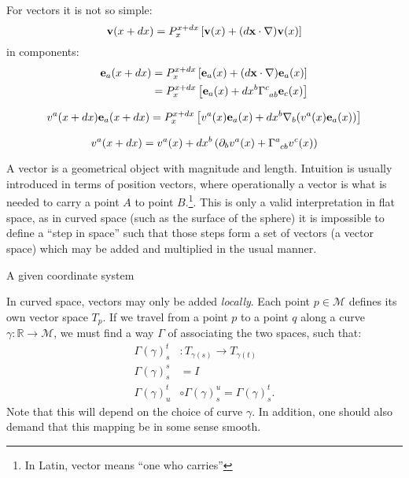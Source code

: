 For vectors it is not so simple:
\begin{equation}
  \mathbf{v}(x+dx) = P_{x}^{x+dx} \left[ \mathbf{v}(x) + (d\mathbf{x}\cdot\nabla)\mathbf{v}(x)  \right]
  \label{eqn:dg:taylor_vector}
\end{equation}
in components:
\begin{align}
  \ve_a(x+dx) &= P_{x}^{x+dx} \left[ \ve_a(x) + (d\vx\cdot\nabla)\ve_a(x)  \right] 
  \label{eqn:dg:taylor_vector_comp} \\
  &= P_{x}^{x+dx} \left[ \ve_a(x) + dx^{b}\TG{c}{ab}\ve_c(x)  \right] 
  \label{eqn:dg:taylor_vector_comp} \\
\end{align}



\begin{equation}
  v^a(x+dx)\mathbf{e}_a(x+dx) = P_{x}^{x+dx} \left[ v^a(x)\mathbf{e}_a(x) + dx^b\nabla_b(v^a(x)\mathbf{e}_a(x))  \right]
  \label{eqn:dg:taylor_scalar}
\end{equation}

\begin{equation}
  v^a(x+dx) = v^a(x) + dx^b\left( \partial_b v^a(x) + \TG{a}{cb}v^c(x) \right)
  \label{eqn:dg:taylor_vector}
\end{equation}


A vector is a geometrical object with magnitude and length. Intuition is usually introduced in terms of position vectors, where operationally a vector is what is needed to carry a point $A$ to point $B$.\footnote{In Latin, vector means ``one who carries''}. This is only a valid interpretation in flat space, as in curved space (such as the surface of the sphere) it is impossible to define a ``step in space'' such that those steps form a set of vectors (a vector space) which may be added and multiplied in the usual manner. 

A given coordinate system

In curved space, vectors may only be added {\em locally}. Each point $p\in \mathcal{M}$ defines its own vector space $T_p$. If we travel from a point $p$ to a point $q$ along a curve $\gamma: \mathbb{R}\to \mathcal{M}$, we must find a way $\Gamma$ of associating the two spaces, such that:
\begin{align}
  \Gamma(\gamma)^t_s &: T_{\gamma(s)} \to T_{\gamma(t)} \\
  \Gamma(\gamma)^s_s &= I \\
  \Gamma(\gamma)^t_u &\circ \Gamma(\gamma)^u_s =  \Gamma(\gamma)^t_s.
\end{align}
Note that this will depend on the choice of curve $\gamma$.  In addition, one should also demand that this mapping be in some sense smooth.

